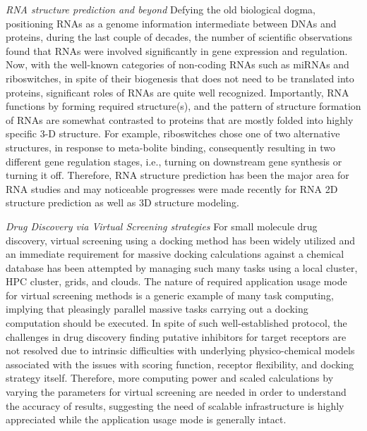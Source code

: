 \documentclass{sig-alternate}
\begin{document}
\textit{RNA structure prediction and beyond}
Defying the old biological dogma, positioning RNAs as a genome information intermediate between DNAs and proteins, during the last couple of decades, the number of scientific observations found that RNAs were involved significantly in gene expression and regulation\cite{joyce1999,cruz2009,encode2007,amaral2008}.  Now, with the well-known categories of non-coding RNAs such as miRNAs and riboswitches, in spite of their biogenesis that does not need to be translated into proteins, significant roles of RNAs are quite well recognized\cite{costa2009,ellington2007,baek2008,blouin2009,henkin2009}.  Importantly, RNA functions by forming required structure(s), and the pattern of structure formation of RNAs are somewhat contrasted to proteins that are mostly folded into highly specific 3-D structure\cite{roth2009}. For example, riboswitches chose one of two alternative structures, in response to meta-bolite binding, consequently resulting in two different gene regulation stages, i.e., turning on downstream gene synthesis or turning it off\cite{montange2008,dambach2009,weinberg2007}.  Therefore, RNA structure prediction has been the major area for RNA studies and may noticeable progresses were made recently for RNA 2D structure prediction as well as 3D structure modeling\cite{shapiro2007,mathews2006,ding2003}.   




\textit{Drug Discovery via Virtual Screening strategies}
For small molecule drug discovery, virtual screening using a docking method has been widely utilized and an immediate requirement for massive docking calculations against a chemical database has been attempted by managing such many tasks using a local cluster, HPC cluster, grids, and clouds\cite{levesque2009,yim2010}.  The nature of required application usage mode for virtual screening methods is a generic example of many task computing, implying that pleasingly parallel massive tasks carrying out a docking computation should be executed.  In spite of such well-established protocol, the challenges in drug discovery finding putative inhibitors for target receptors are not resolved due to intrinsic difficulties with underlying physico-chemical models associated with the issues with scoring function, receptor flexibility, and docking strategy itself\cite{amaro2010}.  Therefore, more computing power and scaled calculations by varying the parameters for virtual screening are needed in order to understand the accuracy of results, suggesting the need of scalable infrastructure is highly appreciated while the application usage mode is generally intact.   
\end{document}
